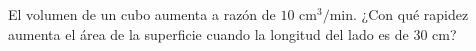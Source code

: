 \item El volumen de un cubo aumenta a razón de $10 \text{ cm}^3/\text{min}$. ¿Con qué rapidez aumenta el área de la superficie cuando la longitud del lado es de $30 \text{ cm}$?
